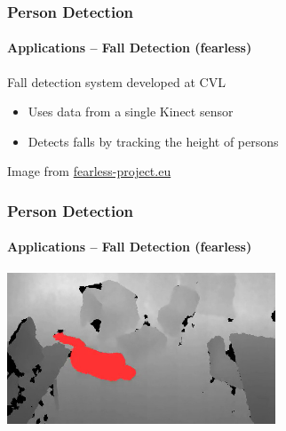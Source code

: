\documentclass[xetex,professionalfont]{beamer}
\begin{document}
\begin{frame}
\frametitle{Person Detection}
\framesubtitle{Applications -- Fall Detection (fearless)}

Fall detection system developed at CVL
\begin{itemize}
	\item Uses data from a single Kinect sensor
    \item Detects falls by tracking the height of persons
\end{itemize}

\bigskip
\begin{center}
    {\centering Image from \url{fearless-project.eu}}
\end{center}

\end{frame}


\begin{frame}
\frametitle{Person Detection}
\framesubtitle{Applications -- Fall Detection (fearless)}

\begin{center}
    \includegraphics[width=8cm]{figures/fearless-screenshot.jpg}
\end{center}

\end{frame}

\end{document}
